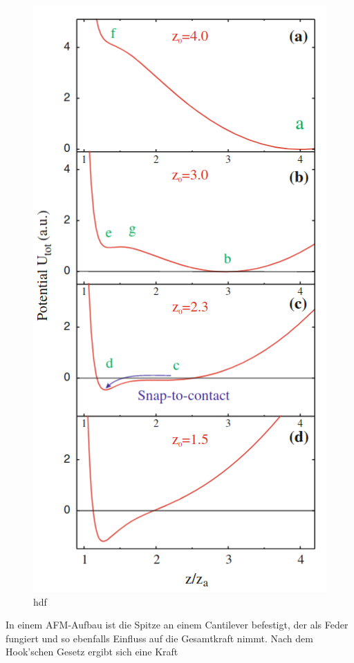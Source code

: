           \begin{figure}
            \includegraphics[scale = 0.3]{pictures/pot_contact.png}
            \caption{hdf}
            \label{fig:pot_contact}
          \end{figure}

          \FloatBarrier

          In einem AFM-Aufbau ist die Spitze an einem Cantilever befestigt, der als Feder fungiert und so ebenfalls Einfluss auf die Gesamtkraft nimmt. Nach dem Hook'schen Gesetz ergibt sich eine Kraft 
          
